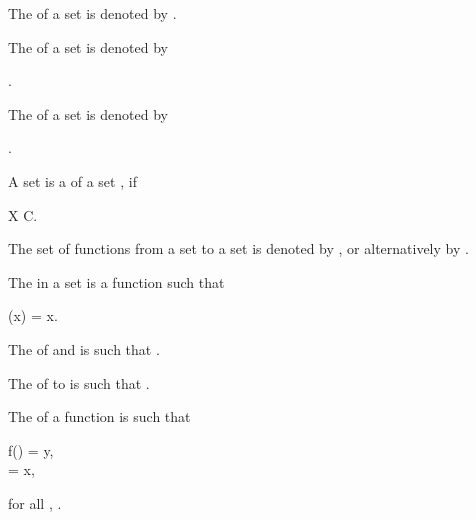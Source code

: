 \documentclass[b5paper, english, oneside]{memoir}
\begin{document}
\begin{definition}
The  of a set  is denoted by .
\end{definition}

\begin{definition}
The  of a set  is denoted by
\begin{eqs}
 \coloneqq {}. 
\end{eqs}
\end{definition}

\begin{definition}
The  of a set  is denoted by
\begin{eqs}
 \coloneqq {}. 
\end{eqs}
\end{definition}

\begin{definition}
A set  is a  of a set , if
\begin{eqs}
X \subset \bigcup C. 
\end{eqs}
\end{definition}

\begin{definition}
The set of functions from a set  to a set  is denoted by , or alternatively by . 
\end{definition}

\begin{definition}
The  in a set  is a function  such that
\begin{eqs}
(x) = x. 
\end{eqs}
\end{definition}

\begin{definition}[Composition]
The  of  and  is  such that . 
\end{definition}

\begin{definition}[Restriction]
The  of  to  is  such that . 
\end{definition}

\begin{definition}
The  of a function  is  such that
\begin{eqs}
f() = y, \\
 = x,
\end{eqs}
for all , .
\end{definition}
\end{document}
